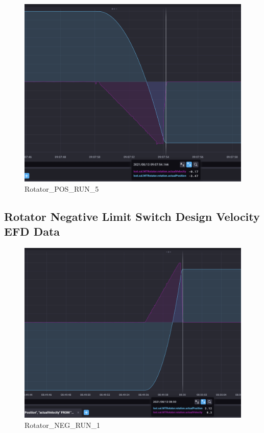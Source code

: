 \documentclass[SE,lsstdraft,authoryear,toc]{lsstdoc}
\begin{document}
\begin{figure}
  \includegraphics[width=\linewidth]{media/rotator_pos_5.png}
  \caption{Rotator\_POS\_RUN\_5}
  \label{fig:Rotator_POS_RUN_5}
\end{figure}
\subsection{Rotator Negative Limit Switch Design Velocity EFD Data}
\begin{figure}
  \includegraphics[width=\linewidth]{media/rotator_neg_1.png}
  \caption{Rotator\_NEG\_RUN\_1}
  \label{fig:Rotator_NEG_RUN_1}
\end{figure}
\end{document}
